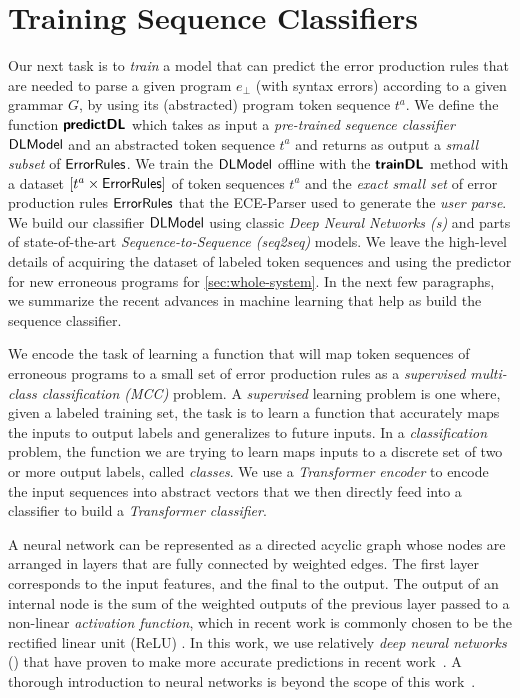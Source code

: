 \section{Training Sequence Classifiers}
\label{sec:seq-classifiers}

Our next task is to \emph{train} a model that can predict the error production
rules that are needed to parse a given program $e_{\bot}$ (with syntax errors)
according to a given grammar $G$, by using its (abstracted) program token
sequence $t^a$.
%
We define the function $\bm{\mathsf{predictDL}}$ which takes as input a \emph{pre-trained
sequence classifier} $\mathsf{DLModel}$ and an abstracted token sequence $t^a$ and returns
as output a \emph{small subset} of $\mathsf{ErrorRules}$.
%
We train the $\mathsf{DLModel}$ offline with the $\bm{\mathsf{trainDL}}$ method with a dataset
$[t^a \times \mathsf{ErrorRules}]$ of token sequences $t^a$ and the \emph{exact
small set} of error production rules $\mathsf{ErrorRules}$ that the ECE-Parser used
to generate the \emph{user parse}. We build our classifier $\mathsf{DLModel}$ using
classic \emph{Deep Neural Networks (\dnn{}s)} and parts of state-of-the-art
\emph{Sequence-to-Sequence (seq2seq)} models. We leave the high-level details of
acquiring the dataset of labeled token sequences and using the predictor for new
erroneous programs for \autoref{sec:whole-system}. In the next few paragraphs,
we summarize the recent advances in machine learning that help as build the
sequence classifier.

We encode the task of learning a function that will map token sequences of
erroneous programs to a small set of error production rules as a
\emph{supervised multi-class classification (MCC)} problem. A \emph{supervised}
learning problem is one where, given a labeled training set, the task is to
learn a function that accurately maps the inputs to output labels and
generalizes to future inputs. In a \emph{classification} problem, the function
we are trying to learn maps inputs to a discrete set of two or more output
labels, called \emph{classes}. We use a \emph{Transformer encoder} to encode the
input sequences into abstract vectors that we then directly feed into a
\emph{\dnn} classifier to build a \emph{Transformer classifier}.

A neural network can be represented as a directed acyclic graph whose nodes are
arranged in layers that are fully connected by weighted edges. The first layer
corresponds to the input features, and the final to the output. The output of an
internal node is the sum of the weighted outputs of the previous layer passed to
a non-linear \emph{activation function}, which in recent work is commonly chosen
to be the rectified linear unit (ReLU) \citep{Nair2010-xg}. In this work, we use
relatively \emph{deep neural networks} (\dnn) that have proven to make more
accurate predictions in recent work~\citep{Schmidhuber_2015}. A thorough
introduction to neural networks is beyond the scope of this
work~\citep{Hastie2009-bn, Nielsen2015-pu}.

